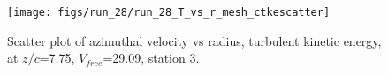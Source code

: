 \begin{figure}[H]
\centering
\texttt{[image: figs/run\_28/run\_28\_T\_vs\_r\_mesh\_ctkescatter]}
\caption{Scatter plot of azimuthal velocity vs radius, turbulent kinetic energy, at $z/c$=7.75, $V_{free}$=29.09, station 3.}
\label{fig:run_28_T_vs_r_mesh_ctkescatter}
\end{figure}


